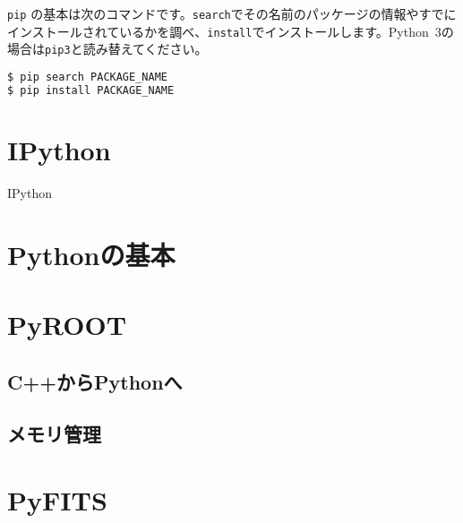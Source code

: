 \texttt{pip} の基本は次のコマンドです。\texttt{search}でその名前のパッケージの情報やすでにインストールされているかを調べ、\texttt{install}でインストールします。Python~3の場合は\texttt{pip3}と読み替えてください。
\begin{lstlisting}[language=bash]
$ pip search PACKAGE_NAME
$ pip install PACKAGE_NAME
\end{lstlisting}  

\section{IPython}
\label{sec:IPython}
IPython

\section{Pythonの基本}

\section{PyROOT}

\subsection{C++からPythonへ}

\subsection{メモリ管理}

\section{PyFITS}
